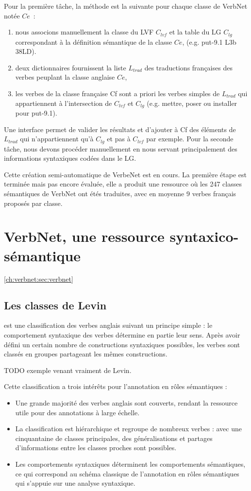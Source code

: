 Pour la première tâche, la méthode est la suivante pour chaque classe de VerbNet notée $Ce$~:
\begin{enumerate}
    \item nous associons manuellement la classe du LVF $C_{lvf}$ et la table du LG $C_{lg}$ correspondant à la définition sémantique de la classe $Ce$, (e.g. put-9.1 L3b 38LD).
    \item deux dictionnaires fournissent la liste $L_{trad}$ des traductions françaises des verbes peuplant la classe anglaise $Ce$, 
    \item les verbes de la classe française Cf sont a priori les verbes simples de $L_{trad}$ qui appartiennent à l'intersection de $C_{lvf}$ et $C_{lg}$ (e.g. mettre, poser ou installer pour put-9.1).
\end{enumerate}

Une interface permet de valider les résultats et d'ajouter à Cf des éléments de $L_{trad}$ qui n'appartiennent qu'à $C_{lg}$ et pas à $C_{lvf}$ par exemple. Pour la seconde tâche, nous devons procéder manuellement en nous servant principalement des informations syntaxiques codées dans le LG.

Cette création semi-automatique de VerbeNet est en cours. La première étape est terminée mais pas encore évaluée, elle a produit une ressource où les 247 classes sémantiques de VerbNet ont étés traduites, avec en moyenne 9 verbes français proposés par classe.

\section{VerbNet, une ressource syntaxico-sémantique}
\ref{ch:verbnet:sec:verbnet}

\subsection{Les classes de Levin}

\cite{levin1993english} est une classification des verbes anglais suivant un principe simple : le comportement syntaxique des verbes détermine en partie leur sens. Après avoir défini un certain nombre de constructions syntaxiques possibles, les verbes sont classés en groupes partageant les mêmes constructions.

TODO exemple venant vraiment de Levin.

Cette classification a trois intérêts pour l'annotation en rôles sémantiques :
\begin{itemize}
    \item Une grande majorité des verbes anglais sont couverts, rendant la ressource utile pour des annotations à large échelle.
    \item La classification est hiérarchique et regroupe de nombreux verbes : avec une cinquantaine de classes principales, des généralisations et partages d'informations entre les classes proches sont possibles.
    \item Les comportements syntaxiques déterminent les comportements sémantiques, ce qui correspond au schéma classique de l'annotation en rôles sémantiques qui s'appuie sur une analyse syntaxique.
\end{itemize}

